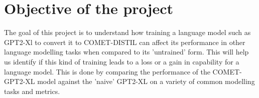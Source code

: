 \documentclass[\main/thesis.tex]{subfiles}
\begin{document}
\chapter{Objective of the project}

The goal of this project is to understand how training a language model such as GPT2-Xl 
to convert it to COMET-DISTIL can affect its performance in other language modelling tasks when
compared to its 'untrained' form. This will help us identify if this kind of training leads
to a loss or a gain in capability for a language model.
This is done by comparing the performance of the COMET-GPT2-XL\cite{west_symbolic_2021} model against the 'naive' GPT2-XL 
on a variety of common modelling tasks and metrics. 
\end{document}
